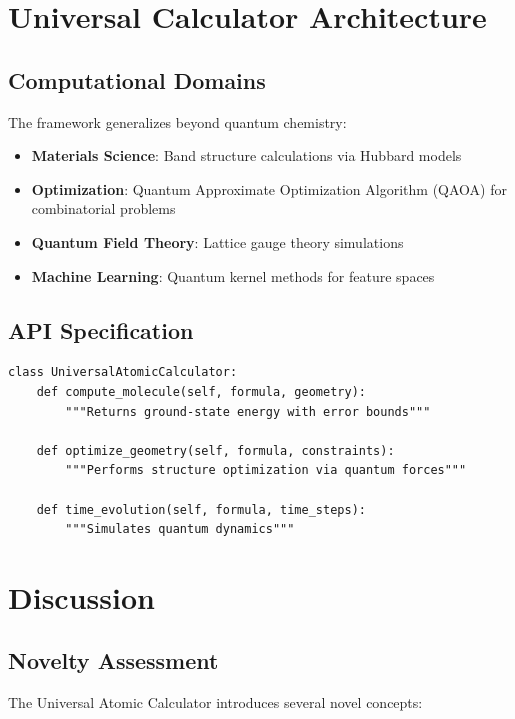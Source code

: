 \documentclass[12pt]{article}
\begin{document}
\section{Universal Calculator Architecture}

\subsection{Computational Domains}
The framework generalizes beyond quantum chemistry:

\begin{itemize}
\item \textbf{Materials Science}: Band structure calculations via Hubbard models
\item \textbf{Optimization}: Quantum Approximate Optimization Algorithm (QAOA) for combinatorial problems
\item \textbf{Quantum Field Theory}: Lattice gauge theory simulations
\item \textbf{Machine Learning}: Quantum kernel methods for feature spaces
\end{itemize}

\subsection{API Specification}
\begin{verbatim}
class UniversalAtomicCalculator:
    def compute_molecule(self, formula, geometry):
        """Returns ground-state energy with error bounds"""
        
    def optimize_geometry(self, formula, constraints):
        """Performs structure optimization via quantum forces"""
        
    def time_evolution(self, formula, time_steps):
        """Simulates quantum dynamics"""
\end{verbatim}

\section{Discussion}

\subsection{Novelty Assessment}
The Universal Atomic Calculator introduces several novel concepts:
\end{document}
